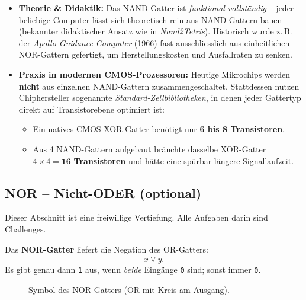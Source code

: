 \begin{myremark}
    \begin{itemize}
        \item \textbf{Theorie \& Didaktik:} Das NAND-Gatter ist \emph{funktional vollständig} -- jeder beliebige Computer lässt sich theoretisch rein aus NAND-Gattern bauen (bekannter didaktischer Ansatz wie in \textit{Nand2Tetris}). Historisch wurde z.\,B. der \textit{Apollo Guidance Computer} (1966) fast ausschliesslich aus einheitlichen NOR-Gattern gefertigt, um Herstellungskosten und Ausfallraten zu senken.
        \item \textbf{Praxis in modernen CMOS-Prozessoren:} Heutige Mikrochips werden \textbf{nicht} aus einzelnen NAND-Gattern zusammengeschaltet. Stattdessen nutzen Chiphersteller sogenannte \textit{Standard-Zellbibliotheken}, in denen jeder Gattertyp direkt auf Transistorebene optimiert ist:
        \begin{itemize}
            \item Ein natives CMOS-XOR-Gatter benötigt nur \textbf{6 bis 8 Transistoren}.
            \item Aus 4 NAND-Gattern aufgebaut bräuchte dasselbe XOR-Gatter $4 \times 4 = \mathbf{16}$ \textbf{Transistoren} und hätte eine spürbar längere Signallaufzeit.
        \end{itemize}
    \end{itemize}
\end{myremark}

\subsection{NOR -- Nicht-ODER (optional)}

Dieser Abschnitt ist eine freiwillige Vertiefung. Alle Aufgaben darin sind Challenges.

\begin{mydefinition}
    Das \textbf{NOR-Gatter} liefert die Negation des OR-Gatters:
    \[
        \overline{x \vee y}.
    \]
    Es gibt genau dann \texttt{1} aus, wenn \emph{beide} Eingänge \texttt{0} sind; sonst immer \texttt{0}.
\end{mydefinition}

\begin{figure}[H]
    \centering
    
    \caption{Symbol des NOR-Gatters (OR mit Kreis am Ausgang).}
    \label{fig:nor_gatter}
\end{figure}

